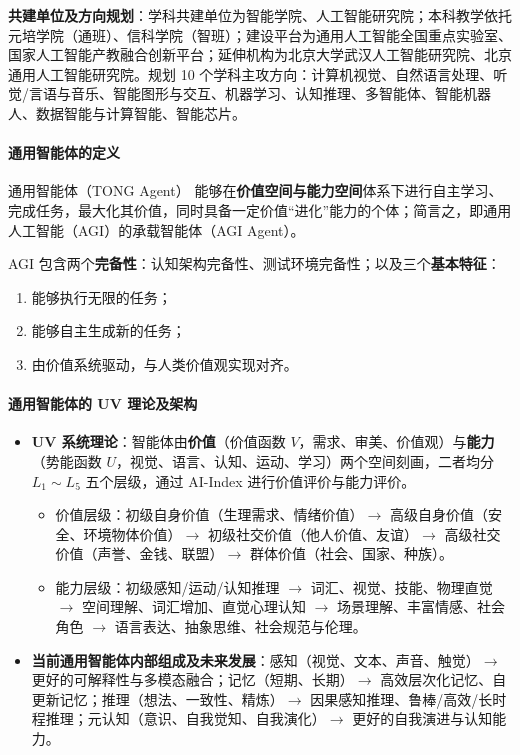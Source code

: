\textbf{共建单位及方向规划}：学科共建单位为智能学院、人工智能研究院；本科教学依托元培学院（通班）、信科学院（智班）；建设平台为通用人工智能全国重点实验室、国家人工智能产教融合创新平台；延伸机构为北京大学武汉人工智能研究院、北京通用人工智能研究院。规划 10 个学科主攻方向：计算机视觉、自然语言处理、听觉/言语与音乐、智能图形与交互、机器学习、认知推理、多智能体、智能机器人、数据智能与计算智能、智能芯片。

\paragraph{通用智能体的定义}

\begin{fancybox}[grassgreen]{通用智能体（TONG Agent）}
能够在\textbf{价值空间与能力空间}体系下进行自主学习、完成任务，最大化其价值，同时具备一定价值“进化”能力的个体；简言之，即通用人工智能（AGI）的承载智能体（AGI Agent）。
\end{fancybox}

AGI 包含两个\textbf{完备性}：认知架构完备性、测试环境完备性；以及三个\textbf{基本特征}：

\begin{enumerate}[itemsep=2pt]
    \item 能够执行无限的任务；
    \item 能够自主生成新的任务；
    \item 由价值系统驱动，与人类价值观实现对齐。
\end{enumerate}

\paragraph{通用智能体的 UV 理论及架构}

\begin{itemize}[itemsep=2pt]
    \item \textbf{UV 系统理论}：智能体由\textbf{价值}（价值函数 $V$，需求、审美、价值观）与\textbf{能力}（势能函数 $U$，视觉、语言、认知、运动、学习）两个空间刻画，二者均分 $L_1 \sim L_5$ 五个层级，通过 AI-Index 进行价值评价与能力评价。
    \begin{itemize}
        \item 价值层级：初级自身价值（生理需求、情绪价值）$\to$ 高级自身价值（安全、环境物体价值）$\to$ 初级社交价值（他人价值、友谊）$\to$ 高级社交价值（声誉、金钱、联盟）$\to$ 群体价值（社会、国家、种族）。
        \item 能力层级：初级感知/运动/认知推理 $\to$ 词汇、视觉、技能、物理直觉 $\to$ 空间理解、词汇增加、直觉心理认知 $\to$ 场景理解、丰富情感、社会角色 $\to$ 语言表达、抽象思维、社会规范与伦理。
    \end{itemize}
    \item \textbf{当前通用智能体内部组成及未来发展}：感知（视觉、文本、声音、触觉）$\to$ 更好的可解释性与多模态融合；记忆（短期、长期）$\to$ 高效层次化记忆、自更新记忆；推理（想法、一致性、精炼）$\to$ 因果感知推理、鲁棒/高效/长时程推理；元认知（意识、自我觉知、自我演化）$\to$ 更好的自我演进与认知能力。
\end{itemize}

